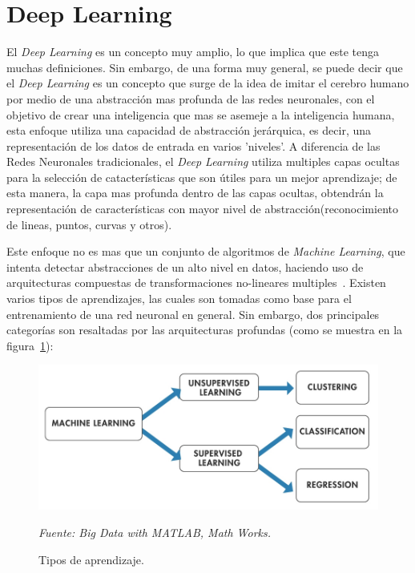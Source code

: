 \section{Deep Learning}
\label{sec:deep-learning}
El \textit{Deep Learning} es un concepto muy amplio, lo que implica que este tenga muchas definiciones. Sin embargo, de una forma muy general, se puede decir que el \textit{Deep Learning} es un concepto que surge de la idea de imitar el cerebro humano por medio de una abstracción mas profunda de las redes neuronales, con el objetivo de crear una inteligencia que mas se asemeje a la inteligencia humana, esta enfoque utiliza una capacidad de abstracción jerárquica, es decir, una representación de los datos de entrada en varios 'niveles'. A diferencia de las Redes Neuronales tradicionales, el \textit{Deep Learning} utiliza multiples capas ocultas para la selección de catacterísticas que son útiles para un mejor aprendizaje; de esta manera, la capa mas profunda dentro de las capas ocultas, obtendrán la representación de características con mayor nivel de abstracción(reconocimiento de lineas, puntos, curvas y otros).

Este enfoque no es mas que un conjunto de algoritmos de \textit{Machine Learning}, que intenta detectar abstracciones de un alto nivel en datos, haciendo uso de arquitecturas compuestas de transformaciones no-lineares multiples~\cite{17bengio2013representation}. Existen varios tipos de aprendizajes, las cuales son tomadas como base para el entrenamiento de una red neuronal en general. Sin embargo, dos principales categorías son resaltadas por las arquitecturas profundas (como se muestra en la figura~\ref{fig:aprendizajes}):

\begin{figure}[H]
		\centering
		\includegraphics[width=130mm]{Imagenes/aprendizaje_tipos.jpg}
		\caption{Tipos de aprendizaje.}
		\vspace{0.15cm}
		\textit{Fuente: Big Data with MATLAB, Math Works.}
		\label{fig:aprendizajes}
\end{figure}

